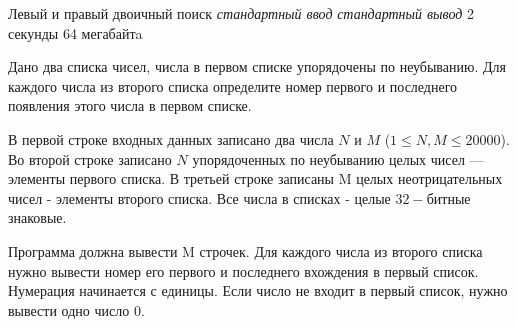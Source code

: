 \begin{problem}%
{Левый и правый двоичный поиск}%
{\textsl{стандартный ввод}}%
{\textsl{стандартный вывод}}%
{2 секунды}%
{64 мегабайтa}{}

Дано два списка чисел, числа в первом списке упорядочены по неубыванию. Для каждого числа из второго списка определите номер первого и последнего появления этого числа в первом списке.

\InputFile

В первой строке входных данных записано два числа $N$ и $M$ ($1 \le N,M \le 20000$). Во второй строке записано $N$ упорядоченных по неубыванию целых чисел — элементы первого списка. В третьей строке записаны M целых неотрицательных чисел - элементы второго списка. Все числа в списках - целые $32-битные$ знаковые.

\OutputFile

Программа должна вывести M строчек. Для каждого числа из второго списка нужно вывести номер его первого и последнего вхождения в первый список. Нумерация начинается с единицы. Если число не входит в первый список, нужно вывести одно число $0$.

\Examples

\begin{example}
%
\end{example}
\end{problem}
